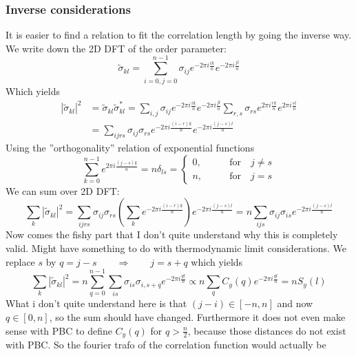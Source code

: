 	\subsubsection{Inverse considerations}
	It is easier to find a relation to fit the correlation length by going the inverse way. We write down the 2D DFT of the order parameter:
	\begin{equation}
		\tilde{\sigma}_{kl} =	\sum_{i =	0,j = 0}^{n-1} \sigma_{ij} e^{-2 \pi i \frac{ik}{n}} e^{-2 \pi i \frac{jl}{n}}
	\end{equation}
	Which yields
	\begin{align}
		|\tilde{\sigma}_{kl}|^2 &=	\tilde{\sigma}_{kl}	\tilde{\sigma}_{kl}^* =	\sum_{i,j}^{} \sigma_{ij} e^{-2 \pi i \frac{ik}{n}} e^{-2 \pi i \frac{jl}{n}} \sum_{r, s}^{} \sigma_{rs} e^{2 \pi i \frac{rk}{n}} e^{2 \pi i \frac{sl}{n}} \\
		&= \sum_{ijrs}^{} \sigma_{ij} \sigma_{rs} e^{-2 \pi i \frac{(i- r) k}{n}} e^{-2 \pi i \frac{(j-s)l}{n}}
	\end{align}
	Using the ''orthogonality''	relation of exponential functions
	\begin{equation}
		\sum_{k =	0}^{n-1} e^{2\pi i \frac{(j-s) k }{n} } =	n \delta_{ls} = \begin{cases}
			0, \qquad &\text{for} \quad j \neq s \\
			n, \qquad &\text{for} \quad j =	s
		\end{cases}
	\end{equation}
	We can sum over 2D DFT:
	\begin{equation}
		\sum_k |\tilde{\sigma}_{kl}|^2  =	 \sum_{ijrs}^{} \sigma_{ij} \sigma_{rs} \left(\sum_k e^{-2 \pi i \frac{(i- r)k}{n}} \right) e^{-2 \pi i \frac{(j-s)l}{n}} =	n \sum_{ijs}^{} \sigma_{ij} \sigma_{is} e^{-2 \pi i \frac{(j-s)l}{n}}
	\end{equation}
	Now comes the fishy part that I don't quite understand why this is completely valid. Might have something to do with thermodynamic limit considerations. We replace $s$ by $q =	j-s \qquad \Rightarrow \qquad j =	s + q$ which yields
	\begin{equation}
		\sum_k |\tilde{\sigma}_{kl}|^2 =n  \sum_{q=0}^{n - 1}  \sum_{is}^{} \sigma_{is} \sigma_{i,s+q} e^{-2 \pi i \frac{ql}{n}}	\propto	n \sum_q C_y(q) e^{-2 \pi i \frac{ql}{n}} =	n S_y(l)
	\end{equation}
	What i don't quite understand here is that $(j-i) \in \left[-n, n\right]$ and now $q \in \left[0, n\right]$, so the sum should have changed. Furthermore it does not even make sense with PBC to define $C_y(q)$ for $q > \frac{n}{2}$, because those distances do not exist with PBC. So the fourier trafo of the correlation function would actually be
